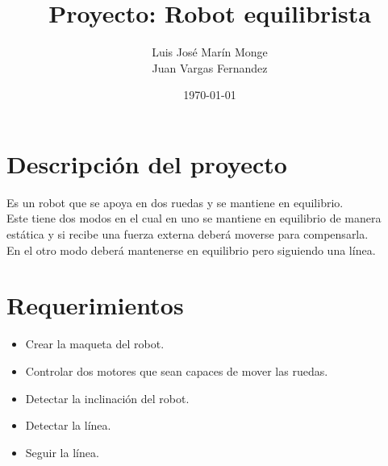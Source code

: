 \documentclass[12pt,letterpaper]{IEEEtran}
\title{Proyecto: Robot equilibrista}
\author{Luis José Marín Monge\\  Juan Vargas Fernandez}
\date{\today}
\begin{document}

\renewcommand{\leftmark}{UNIVERSIDAD LATINA DE COSTA RICA -- BINGE-62 Microcontroladores}

\maketitle

\section{Descripción del proyecto}

Es un robot que se apoya en dos ruedas y se mantiene en equilibrio.\\
Este tiene dos modos en el cual en uno se mantiene en equilibrio de manera  estática y si recibe una fuerza externa deberá moverse para compensarla.\\
En el otro modo deberá mantenerse en equilibrio pero siguiendo una línea.


\section{Requerimientos}

\begin{itemize}
	\item Crear la maqueta del robot.
	
	\item Controlar dos motores que sean capaces de mover las ruedas.
	
	\item Detectar la inclinación del robot.
	
	\item Detectar la línea.
	
	\item Seguir la línea.
\end{itemize}


\end{document}
